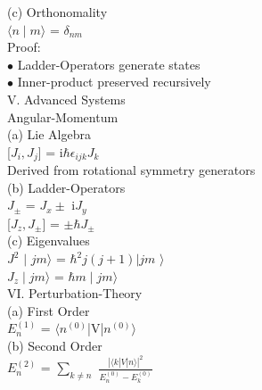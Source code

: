 \documentclass[a4paper, 10pt, onepage]{elegantbook}
\begin{document}
{(c) Orthonomality  \\  

$\langle n \mid m \rangle$ = $\delta_{nm}$ \\ 

Proof:  \\
  
    $\bullet$ Ladder-Operators generate states  \\
  
    $\bullet$ Inner-product preserved recursively  \\

V. Advanced Systems \\ 

Angular-Momentum  \\

(a) Lie Algebra \\ 

[$J_i,J_j$] = i$\hbar \epsilon_{ijk} J_k$  \\
  
Derived from rotational symmetry generators \\ 

(b) Ladder-Operators \\

$J_\pm$ = $J_x \pm$ i$J_y$ \\
 
[$J_z,J_\pm$] = $\pm \hbar J_\pm$  \\  

(c) Eigenvalues  \\

$J^2$ $\mid$ ${jm} \rangle$ = $\hbar^2j(j + 1)| {jm}$ $\rangle$ \\
 
$J_z \mid {jm} \rangle$ = $\hbar m \mid{jm} \rangle$  \\

VI. Perturbation-Theory  \\  

(a) First Order  \\  

$E_{n}^{(1)}$ = $\langle n^{(0)}$|V|$n^{(0)} \rangle$ \\ 

(b) Second Order  \\
  
$E_{n}^{(2)}$ = $\sum_{k \neq n}$ $\frac{| \langle {k}|{V}|{n} \rangle |^2}{E_{n}^{(0)} - E_{k}^{(0)}}$ \\ 
    
}
\end{document}

